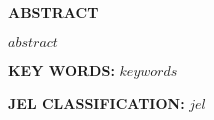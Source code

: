 

\textbf{ABSTRACT}

\vspace{1.5em}

\onehalfspace
$abstract$

\vspace{1.5em}

\textbf{KEY WORDS:} $keywords$ 

\textbf{JEL CLASSIFICATION:} $jel$

\newpage